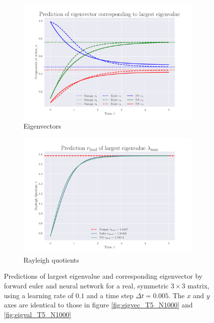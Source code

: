 \documentclass[12pt]{extarticle}
\begin{document}
\begin{figure}[h]
	
	\centering
	\begin{subfigure}{0.49\textwidth}
		\centering
		\includegraphics[width=\textwidth]{../output/plots/eigvec_T5_N1000_eta01.pdf}
		\caption{Eigenvectors}
		\label{fig:eigvec_T5_N1000_eta01}
	\end{subfigure}
	\hfill
	\begin{subfigure}{0.49\textwidth}
		\centering
		\includegraphics[width=\textwidth]{../output/plots/eigval_T5_N1000_eta01.pdf}
		\caption{Rayleigh quotients}
		\label{fig:eigval_T5_N1000_eta01}
	\end{subfigure}
	\caption{Predictions of largest eigenvalue and corresponding eigenvector by forward euler and neural network for a real, symmetric $3\times 3$ matrix, using a learning rate of $0.1$ and a time step $\Delta t = 0.005$. The $x$ and $y$ axes are identical to those in figure \ref{fig:eigvec_T5_N1000} and \ref{fig:eigval_T5_N1000}}
	\label{fig:eig_T5_N1000_eta01}
\end{figure}
\end{document}
